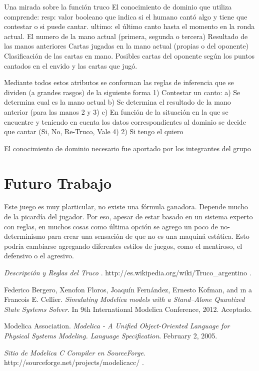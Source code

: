 \documentclass[12pt,a4paper]{article}
\begin{document}
Una mirada sobre la función truco
El conocimiento de dominio que utiliza comprende:
resp: valor booleano que indica si el humano cantó algo y tiene que contestar o si puede cantar.
ultimo: el último canto hasta el momento en la ronda actual.
El numero de la mano actual (primera, segunda o tercera)
Resultado de las manos anteriores
Cartas jugadas en la mano actual (propias o del oponente)
Clasificación de las cartas en mano.
Posibles cartas del oponente según los puntos cantados en el envido y las cartas que jugó.

Mediante todos estos atributos se conforman las reglas de inferencia que se dividen (a grandes rasgos) de la 
siguiente forma
1) Contestar un canto:
	a) Se determina cual es la mano actual
	b) Se determina el resultado de la mano anterior (para las manos 2 y 3)
	c) En función de la situación en la que se encuentre y teniendo en cuenta los datos correspondientes al dominio
	   se decide que cantar (Si, No, Re-Truco, Vale 4)
2) Si tengo el quiero 

El conocimiento de dominio necesario fue aportado por los integrantes del grupo 

\section{Futuro Trabajo}
Este juego es muy plarticular, no existe una f\'ormula ganadora. Depende mucho de la picard\'ia del jugador. Por eso, apesar de estar basado en un sistema experto
con reglas, en muchos cosas como \'ultima opci\'on se agrego un poco de no-determinismo para crear una sensaci\'on  de que no es una maquin\'a est\'atica. 
Esto podr\'ia cambiarse agregando diferentes estilos de juegos, como el mentiroso, el defensivo o el agresivo.   


\begin{thebibliography}{XXX99}

 \emph{Descripci\'on y Reglas del Truco }. http://es.wikipedia.org/wiki/Truco\_argentino .

 Federico Bergero, Xenofon Floros, Joaqu\'in Fern\'andez, Ernesto Kofman, and
ın a Francois E. Cellier. \emph{Simulating Modelica models with a Stand–Alone Quantized State Systems Solver}. 
In 9th International Modelica Conference, 2012. Aceptado.

 Modelica Association. \emph{Modelica 
 - A Unified Object-Oriented Language for Physical Systems Modeling. Language Specification}. 
February 2, 2005.



 \emph{Sitio de Modelica C Compiler en SourceForge}. http://sourceforge.net/projects/modelicacc/ . 



\end{thebibliography}
\end{document}
